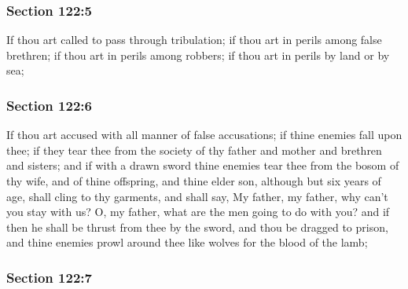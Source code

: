 	\subsubsection{Section 122:5} %
		\label{DC122-5}

		If thou art called to pass through tribulation; if thou art in perils among false brethren; if thou art in perils among robbers; if thou art in perils by land or by sea;


	\subsubsection{Section 122:6} %
		\label{DC122-6}

		If thou art accused with all manner of false accusations; if thine enemies fall upon thee; if they tear thee from the society of thy father and mother and brethren and sisters; and if with a drawn sword thine enemies tear thee from the bosom of thy wife, and of thine offspring, and thine elder son, although but six years of age, shall cling to thy garments, and shall say, My father, my father, why can't you stay with us?  O, my father, what are the men going to do with you?  and if then he shall be thrust from thee by the sword, and thou be dragged to prison, and thine enemies prowl around thee like wolves for the blood of the lamb;


	\subsubsection{Section 122:7} %
		\label{DC122-7}


